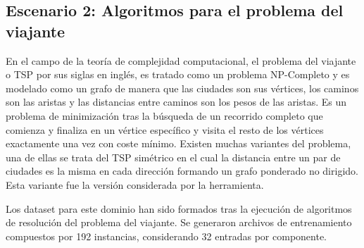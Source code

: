 \subsection{Escenario 2: Algoritmos para el problema del viajante\label{subsec:Escenario-1:-Algoritmos}}

En el campo de la teoría de complejidad computacional, el problema
del viajante o \ac{TSP} por sus siglas en inglés, es tratado como
un problema NP-Completo y es modelado como un grafo de manera que
las ciudades son sus vértices, los caminos son las aristas y las distancias
entre caminos son los pesos de las aristas. Es un problema de minimización
tras la búsqueda de un recorrido completo que comienza y finaliza
en un vértice específico y visita el resto de los vértices exactamente
una vez con coste mínimo. Existen muchas variantes del problema, una
de ellas se trata del \ac{TSP} simétrico en el cual la distancia
entre un par de ciudades es la misma en cada dirección formando un
grafo ponderado no dirigido. Esta variante fue la versión considerada
por la herramienta. 

Los dataset para este dominio han sido formados tras la ejecución
de algoritmos de resolución del problema del viajante. Se generaron
archivos de entrenamiento compuestos por 192 instancias, considerando
32 entradas por componente.

